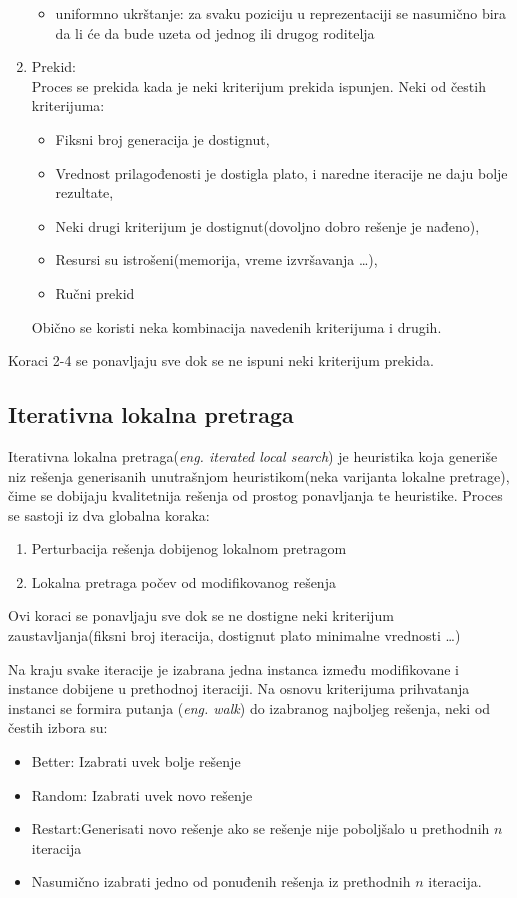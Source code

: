 \documentclass[a4paper]{article}
\begin{document}
\begin{enumerate}
\begin{itemize}
\item uniformno ukrštanje: za svaku poziciju u reprezentaciji se nasumično bira da li će da bude uzeta od jednog ili drugog roditelja
\end{itemize}
\item Prekid: \\ Proces se prekida kada je neki kriterijum prekida ispunjen. Neki od čestih kriterijuma:
\begin{itemize}
\item Fiksni broj generacija je dostignut,
\item Vrednost prilagođenosti je dostigla plato, i naredne iteracije ne daju bolje rezultate,
\item Neki drugi kriterijum je dostignut(dovoljno dobro rešenje je nađeno),
\item Resursi su istrošeni(memorija, vreme izvršavanja \ldots),
\item Ručni prekid
\end{itemize}
Obično se koristi neka kombinacija navedenih kriterijuma i drugih.
\end{enumerate}

 Koraci 2-4 se ponavljaju sve dok se ne ispuni neki kriterijum prekida.


\subsection{Iterativna lokalna pretraga}

Iterativna lokalna pretraga(\emph{eng. iterated local search}) je heuristika koja generiše niz rešenja generisanih unutrašnjom heuristikom(neka varijanta lokalne pretrage), čime se dobijaju kvalitetnija rešenja od prostog ponavljanja te heuristike\cite{lourenccoils}. 
Proces se sastoji iz dva globalna koraka:
\begin{enumerate}
\item Perturbacija rešenja dobijenog lokalnom pretragom
\item Lokalna pretraga počev od modifikovanog rešenja
\end{enumerate}

Ovi koraci se ponavljaju sve dok se ne dostigne neki kriterijum zaustavljanja(fiksni broj iteracija, dostignut plato minimalne vrednosti \ldots)

Na kraju svake iteracije je izabrana jedna instanca između modifikovane i instance dobijene u prethodnoj iteraciji. Na osnovu kriterijuma prihvatanja instanci se formira putanja (\emph{eng. walk}) do izabranog najboljeg rešenja, neki od čestih izbora su:
\begin{itemize}
\item Better: Izabrati uvek bolje rešenje
\item Random: Izabrati uvek novo rešenje
\item Restart:Generisati novo rešenje ako se rešenje nije poboljšalo u prethodnih $n$ iteracija
\item Nasumično izabrati jedno od ponuđenih rešenja iz prethodnih $n$ iteracija.
\end{itemize}
\end{document}
